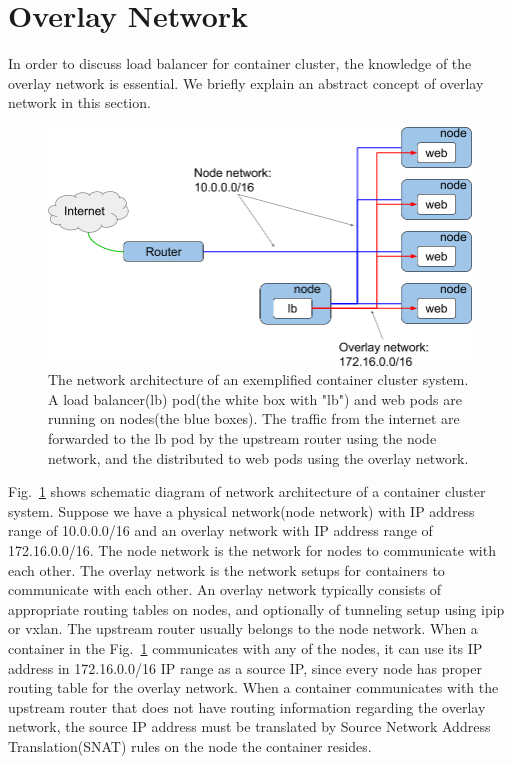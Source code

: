 \section{Overlay Network}\label{sec:overlay_network}

In order to discuss load balancer for container cluster, the knowledge of the overlay network is essential.
We briefly explain an abstract concept of overlay network in this section.

\begin{figure}[tb]
\centering
\includegraphics[width=0.8\columnwidth]{Figs/overlay.png}
\caption{
  The network architecture of an exemplified container cluster system. %
  A load balancer(lb) pod(the white box with "lb") and web pods are running on nodes(the blue boxes).
  The traffic from the internet are forwarded to the lb pod by the upstream router using the node network,
  and the distributed to web pods using the overlay network.
}
\label{fig:overlay}
\end{figure}

Fig.~\ref{fig:overlay} shows schematic diagram of network architecture of a container cluster system. 
Suppose we have a physical network(node network) with IP address range of 10.0.0.0/16 and an overlay network with IP address range of 172.16.0.0/16.
The node network is the network for nodes to communicate with each other.
The overlay network is the network setups for containers to communicate with each other.
An overlay network typically consists of appropriate routing tables on nodes, and optionally of tunneling setup using ipip or vxlan.
The upstream router usually belongs to the node network.
When a container in the Fig.~\ref{fig:overlay} communicates with any of the nodes, it can use its IP address in 172.16.0.0/16 IP range as a source IP, since every node has proper routing table for the overlay network.
When a container communicates with the upstream router that does not have routing information regarding the overlay network, the source IP address must be translated by Source Network Address Translation(SNAT) rules on the node the container resides.

